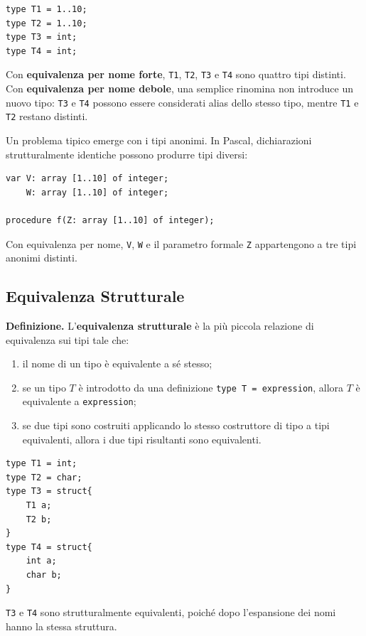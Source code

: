 \documentclass{article}
\begin{document}
\begin{lstlisting}
type T1 = 1..10;
type T2 = 1..10;
type T3 = int;
type T4 = int;
\end{lstlisting}

Con \textbf{equivalenza per nome forte}, \texttt{T1}, \texttt{T2}, \texttt{T3} e \texttt{T4} sono quattro tipi distinti. Con \textbf{equivalenza per nome debole}, una semplice rinomina non introduce un nuovo tipo: \texttt{T3} e \texttt{T4} possono essere considerati alias dello stesso tipo, mentre \texttt{T1} e \texttt{T2} restano distinti.

Un problema tipico emerge con i tipi anonimi. In Pascal, dichiarazioni strutturalmente identiche possono produrre tipi diversi:

\begin{lstlisting}
var V: array [1..10] of integer;
    W: array [1..10] of integer;

procedure f(Z: array [1..10] of integer);
\end{lstlisting}

Con equivalenza per nome, \texttt{V}, \texttt{W} e il parametro formale \texttt{Z} appartengono a tre tipi anonimi distinti.

\subsection{Equivalenza Strutturale}

\textbf{Definizione.} L'\textbf{equivalenza strutturale} è la più piccola relazione di equivalenza sui tipi tale che:
\begin{enumerate}
  \item il nome di un tipo è equivalente a sé stesso;
  \item se un tipo $T$ è introdotto da una definizione \texttt{type T = expression}, allora $T$ è equivalente a \texttt{expression};
  \item se due tipi sono costruiti applicando lo stesso costruttore di tipo a tipi equivalenti, allora i due tipi risultanti sono equivalenti.
\end{enumerate}

\begin{lstlisting}
type T1 = int;
type T2 = char;
type T3 = struct{
    T1 a;
    T2 b;
}
type T4 = struct{
    int a;
    char b;
}
\end{lstlisting}

\texttt{T3} e \texttt{T4} sono strutturalmente equivalenti, poiché dopo l'espansione dei nomi hanno la stessa struttura.
\end{document}
